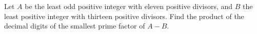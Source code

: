 Let $ A $ be the least odd positive integer with eleven positive divisors, and $ B $ the least positive integer with thirteen positive divisors. Find the product of the decimal digits of the smallest prime factor of $ A-B $.

